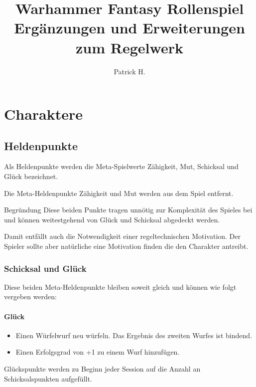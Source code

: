 \documentclass[a4paper,10pt,twoside,twocolumn,openany,nodeprecatedcode,bg=print]{dndbook}
\title{
  Warhammer Fantasy Rollenspiel\newline
  \large Ergänzungen und Erweiterungen zum Regelwerk
  }
\author{Patrick H.}
\date{}
\begin{document}
\frontmatter

\maketitle






\chapter{Charaktere}
\section{Heldenpunkte}
Als Heldenpunkte werden die Meta-Spielwerte Zähigkeit, Mut, Schicksal und Glück bezeichnet.

\begin{DndReadAloud}[color=WhiteColor]
  Die Meta-Heldenpunkte Zähigkeit und Mut werden aus dem Spiel entfernt.
  \begin{DndComment}{Begründung}
    Diese beiden Punkte tragen unnötig zur Komplexität des Spieles bei und können weitestgehend von Glück und Schicksal abgedeckt werden.
  \end{DndComment}
\end{DndReadAloud}

\noindent
Damit entfällt auch die Notwendigkeit einer regeltechnischen Motivation.
Der Spieler sollte aber natürliche eine Motivation finden die den Charakter antreibt.



\subsection{Schicksal und Glück}
Diese beiden Meta-Heldenpunkte bleiben soweit gleich und können wie folgt vergeben werden:
\subsubsection{Glück}
\begin{itemize}
  \item Einen Würfelwurf neu würfeln. Das Ergebnis des zweiten Wurfes ist bindend.
  \item Einen Erfolgsgrad von +1 zu einem Wurf hinzufügen.
\end{itemize}
Glückspunkte werden zu Beginn jeder Session auf die Anzahl an Schicksalspunkten aufgefüllt.
\end{document}
